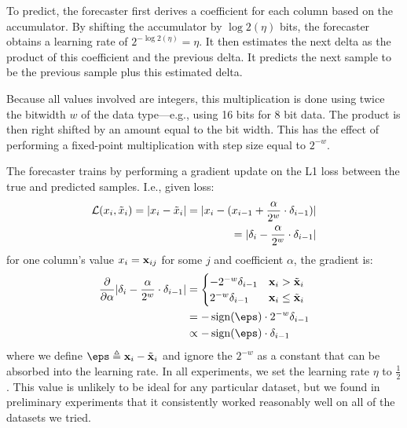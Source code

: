 To predict, the forecaster first derives a coefficient for each column based on the accumulator. By shifting the accumulator by $\log2(\eta)$ bits, the forecaster obtains a learning rate of $2^{-\log2(\eta)} = \eta$. It then estimates the next delta as the product of this coefficient and the previous delta. It predicts the next sample to be the previous sample plus this estimated delta.

Because all values involved are integers, this multiplication is done using twice the bitwidth $w$ of the data type---e.g., using 16 bits for 8 bit data. The product is then right shifted by an amount equal to the bit width. This has the effect of performing a fixed-point multiplication with step size equal to $2^{-w}$.

The forecaster trains by performing a gradient update on the L1 loss between the true and predicted samples. I.e., given loss:
\begin{align}
    \mathcal{L}(x_i, \tilde{x}_{i}) = \lvert x_i - \tilde{x}_i\rvert
    = \lvert x_i - (x_{i-1} + \frac{\alpha}{2^w} \cdot \delta_{i-1})\rvert \\
    = \lvert\delta_{i} - \frac{\alpha}{2^w} \cdot \delta_{i-1}\rvert
\end{align}
for one column's value $x_i = \mathbf{x}_{ij}$ for some $j$ and coefficient $\alpha$, the gradient is:
\begin{align}
        \frac{\partial }{\partial \alpha} \abs{\delta_{i} - \frac{\alpha}{2^w} \cdot \delta_{i-1}}
&= \begin{cases}
        -{2^{-w}}\vdelta_{i-1} & \x_{i} > \tilde{\x}_{i} \\
        {2^{-w}}\vdelta_{i-1} & \x_{i} \le \tilde{\x}_{i}
\end{cases} \\
&= -\sign(\eps) \cdot {2^{-w}}\vdelta_{i-1} \\
&\propto -\sign(\eps) \cdot \vdelta_{i-1}
\end{align}
where we define $\eps \triangleq \x_{i} - \tilde{\x}_{i}$ and ignore the $2^{-w}$ as a constant that can be absorbed into the learning rate. In all experiments, we set the learning rate $\eta$ to $\frac{1}{2}$. This value is unlikely to be ideal for any particular dataset, but we found in preliminary experiments that it consistently worked reasonably well on all of the datasets we tried. %


